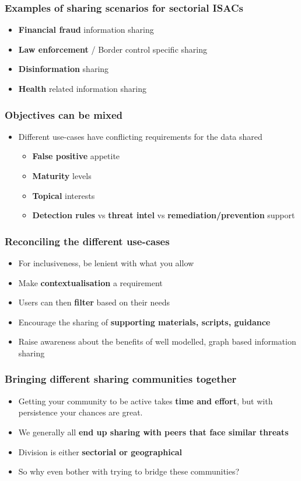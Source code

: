\begin{frame}
	\frametitle{Examples of sharing scenarios for sectorial ISACs}
	\begin{itemize}
		\item {\bf Financial fraud} information sharing
		\item {\bf Law enforcement} / Border control specific sharing
		\item {\bf Disinformation} sharing
		\item {\bf Health} related information sharing
	\end{itemize}
\end{frame}

\begin{frame}
	\frametitle{Objectives can be mixed}
	\begin{itemize}
		\item Different use-cases have conflicting requirements for the data shared
		\begin{itemize}
			\item {\bf False positive} appetite
			\item {\bf Maturity} levels
			\item {\bf Topical} interests
			\item {\bf Detection rules} vs {\bf threat intel} vs {\bf remediation/prevention} support
		\end{itemize}
	\end{itemize}
\end{frame}

\begin{frame}
	\frametitle{Reconciling the different use-cases}
	\begin{itemize}
		\item For inclusiveness, be lenient with what you allow
		\item Make {\bf contextualisation} a requirement
		\item Users can then {\bf filter} based on their needs
		\item Encourage the sharing of {\bf supporting materials, scripts, guidance}
		\item Raise awareness about the benefits of well modelled, graph based information sharing
	\end{itemize}
\end{frame}

\begin{frame}
	\frametitle{Bringing different sharing communities together}
	\begin{itemize}
		\item Getting your community to be active takes {\bf time and effort}, but with persistence your chances are great.
		\item We generally all {\bf end up sharing with peers that face similar threats}
		\item Division is either {\bf sectorial or geographical}
		\item So why even bother with trying to bridge these communities?
	\end{itemize}
\end{frame}

